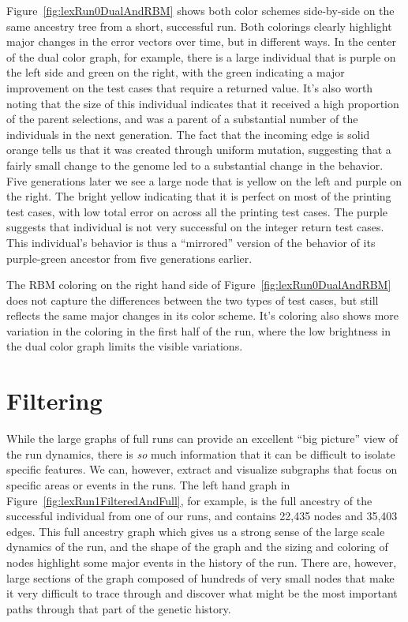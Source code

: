 \documentclass{sig-alternate}
\begin{document}
Figure~\ref{fig:lexRun0DualAndRBM} shows both color schemes side-by-side on the same
ancestry tree from a short, successful run. Both colorings clearly highlight major
changes in the error vectors over time, but in different ways. In the center of the 
dual color graph, for example, there is a large individual that is purple on the left
side and green on the right, with the green indicating a major improvement on the
test cases that require a returned value. It's also worth noting that the size of
this individual indicates that it received a high proportion of the parent selections,
and was a parent of a substantial number of the individuals in the next generation.
The fact that the incoming edge is solid orange tells us that it was created through
uniform mutation, suggesting that a fairly small change to the genome led to a
substantial change in the behavior. Five generations later we see a large node that
is yellow on the left and purple on the right. The bright yellow indicating that 
it is perfect on most of the printing test cases, with low total error on across all
the printing test cases. The purple suggests that individual is not very successful
on the integer return test cases. This individual's behavior is thus a ``mirrored'' 
version of the behavior of its purple-green ancestor from five generations earlier.

The RBM coloring on the right hand side of Figure~\ref{fig:lexRun0DualAndRBM} does not
capture the differences between the two types of test cases, but still reflects the
same major changes in its color scheme. It's coloring also shows more variation in the
coloring in the first half of the run, where the low brightness in the dual color
graph limits the visible variations.


\section{Filtering}
\label{sec:filtering}

While the large graphs of full runs can provide an excellent ``big picture'' 
view of the run dynamics, there is \emph{so} much information that it can be
difficult to isolate specific features. We can, however, extract and visualize
subgraphs that focus on specific areas or events in the runs. The left hand graph
in Figure~\ref{fig:lexRun1FilteredAndFull}, for example, is the full ancestry of the
successful individual from one of our runs, and contains 22,435 nodes
and 35,403 edges. This full ancestry graph which gives us a strong sense of the 
large scale dynamics of the run, and the shape of the graph and the sizing and coloring 
of nodes highlight some major events in the history of the run. There are, however,
large sections of the graph composed of hundreds of very small nodes that make it very
difficult to trace through and discover what might be the most important paths through
that part of the genetic history.
\end{document}
